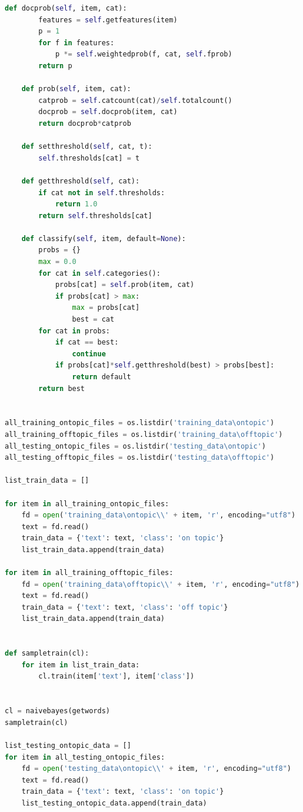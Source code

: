 \documentclass[12pt]{article}
\begin{document}
\begin{lstlisting}[language=Python, caption=Email Classification Using Naive Bayes Classifier]
    def docprob(self, item, cat):
        features = self.getfeatures(item)
        p = 1
        for f in features:
            p *= self.weightedprob(f, cat, self.fprob)
        return p

    def prob(self, item, cat):
        catprob = self.catcount(cat)/self.totalcount()
        docprob = self.docprob(item, cat)
        return docprob*catprob

    def setthreshold(self, cat, t):
        self.thresholds[cat] = t

    def getthreshold(self, cat):
        if cat not in self.thresholds:
            return 1.0
        return self.thresholds[cat]

    def classify(self, item, default=None):
        probs = {}
        max = 0.0
        for cat in self.categories():
            probs[cat] = self.prob(item, cat)
            if probs[cat] > max:
                max = probs[cat]
                best = cat
        for cat in probs:
            if cat == best:
                continue
            if probs[cat]*self.getthreshold(best) > probs[best]:
                return default
        return best


all_training_ontopic_files = os.listdir('training_data\ontopic')
all_training_offtopic_files = os.listdir('training_data\offtopic')
all_testing_ontopic_files = os.listdir('testing_data\ontopic')
all_testing_offtopic_files = os.listdir('testing_data\offtopic')

list_train_data = []

for item in all_training_ontopic_files:
    fd = open('training_data\ontopic\\' + item, 'r', encoding="utf8")
    text = fd.read()
    train_data = {'text': text, 'class': 'on topic'}
    list_train_data.append(train_data)

for item in all_training_offtopic_files:
    fd = open('training_data\offtopic\\' + item, 'r', encoding="utf8")
    text = fd.read()
    train_data = {'text': text, 'class': 'off topic'}
    list_train_data.append(train_data)


def sampletrain(cl):
    for item in list_train_data:
        cl.train(item['text'], item['class'])
    

cl = naivebayes(getwords)
sampletrain(cl)

list_testing_ontopic_data = []
for item in all_testing_ontopic_files:
    fd = open('testing_data\ontopic\\' + item, 'r', encoding="utf8")
    text = fd.read()
    train_data = {'text': text, 'class': 'on topic'}
    list_testing_ontopic_data.append(train_data)


\end{lstlisting}
\end{document}
